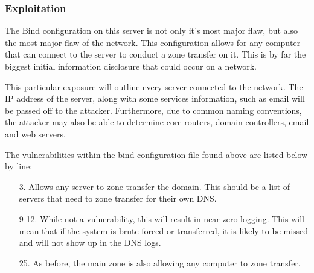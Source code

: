 			\subsubsection{Exploitation}
				The Bind configuration on this server is not only it's most major flaw, but also the most major flaw of the network.
				This configuration allows for any computer that can connect to the server to conduct a zone transfer on it. 
				This is by far the biggest initial information disclosure that could occur on a network. 

				This particular exposure will outline every server connected to the network. 
				The IP address of the server, along with some services information, such as email will be passed off to the attacker. 
				Furthermore, due to common naming conventions, the attacker may also be able to determine core routers, domain controllers, email and web servers. 

				The vulnerabilities within the bind configuration file found above are listed below by line:
				\begin{enumerate}
					\item[3.] Allows any server to zone transfer the domain. 
						This should be a list of servers that need to zone transfer for their own DNS. 
					\item[9-12.] While not a vulnerability, this will result in near zero logging.  
						This will mean that if the system is brute forced or transferred, 
						it is likely to be missed and will not show up in the DNS logs. 
					\item[25.] As before, the main zone is also allowing any computer to zone transfer.
				\end{enumerate}


